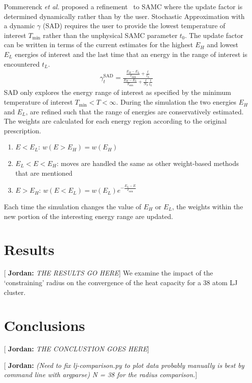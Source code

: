 \documentclass[letterpaper,twocolumn,amsmath,amssymb,pre,aps,10pt]{revtex4-1}
\newcommand{\blue}[1]{{\bf \color{blue} #1}}
\newcommand{\jpsays}[1]{{\color{red} [\blue{Jordan:} \emph{#1}]}}
\begin{document}
Pommerenck \emph{et al.} proposed a refinement~\cite{pommerenck2020stochastic} to SAMC where the update factor is determined dynamically rather than by the user. Stochastic Approximation with a dynamic $\gamma$ (SAD) requires the user to provide the lowest temperature of interest $T_{\min}$ rather than the unphysical SAMC parameter $t_0$. The update factor
can be written in terms of the current estimates for the highest $E_H$ and
lowest $E_L$ energies of interest and the last time that an energy in the range
of interest is encountered $t_L$.
\begin{align}
  \gamma_{t}^{\text{SAD}} =
     \frac{
       \frac{E_{H}-E_{L}}{T_{\text{min}}} + \frac{t}{t_L}
     }{
       \frac{E_{H}-E_{L}}{T_{\text{min}}} + \frac{t}{N_S}\frac{t}{t_L}
     }
\end{align}
SAD only explores the energy range of interest as specified by the minimum
temperature of interest $T_{\min} < T < \infty$. During the simulation the two
energies $E_H$ and $E_L$, are refined such that the range of energies are conservatively
estimated. The weights are calculated for each energy region according to the original
prescription.
\begin{enumerate}
\item {$E < E_L$:} $w(E>E_H) = w(E_H)$
\item {$E_L < E < E_H$:} moves are handled the same as other weight-based
methods that are mentioned
\item {$E > E_H$:} $w(E<E_L) = w(E_L)e^{-\frac{E_L-E}{T_{\min}}}$
\end{enumerate}
Each time the simulation changes the value of $E_H$ or $E_L$, the weights
within the new portion of the interesting energy range are updated.

\section{Results}
\jpsays{THE RESULTS GO HERE}
We examine the impact of the `constraining' radius on the convergence of the heat capacity for a 38 atom LJ cluster.

\section{Conclusions}
\jpsays{THE CONCLUSTION GOES HERE}

\jpsays{(Need to fix lj-comparison.py to plot data probably manually is best by command line with argparse)
N = 38 for the radius comparison.}

\end{document}
